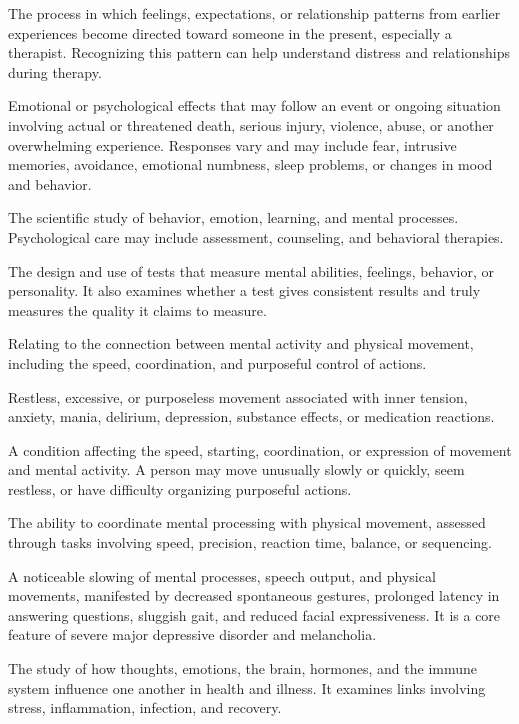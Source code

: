 The process in which feelings, expectations, or relationship patterns from earlier experiences become directed toward someone in the present, especially a therapist. Recognizing this pattern can help understand distress and relationships during therapy.

 Emotional or psychological effects that may follow an event or ongoing situation involving actual or threatened death, serious injury, violence, abuse, or another overwhelming experience. Responses vary and may include fear, intrusive memories, avoidance, emotional numbness, sleep problems, or changes in mood and behavior.

 The scientific study of behavior, emotion, learning, and mental processes. Psychological care may include assessment, counseling, and behavioral therapies.

 The design and use of tests that measure mental abilities, feelings, behavior, or personality. It also examines whether a test gives consistent results and truly measures the quality it claims to measure.

 Relating to the connection between mental activity and physical movement, including the speed, coordination, and purposeful control of actions.

 Restless, excessive, or purposeless movement associated with inner tension, anxiety, mania, delirium, depression, substance effects, or medication reactions.

 A condition affecting the speed, starting, coordination, or expression of movement and mental activity. A person may move unusually slowly or quickly, seem restless, or have difficulty organizing purposeful actions.

 The ability to coordinate mental processing with physical movement, assessed through tasks involving speed, precision, reaction time, balance, or sequencing.

 A noticeable slowing of mental processes, speech output, and physical movements, manifested by decreased spontaneous gestures, prolonged latency in answering questions, sluggish gait, and reduced facial expressiveness. It is a core feature of severe major depressive disorder and melancholia.

 The study of how thoughts, emotions, the brain, hormones, and the immune system influence one another in health and illness. It examines links involving stress, inflammation, infection, and recovery.

